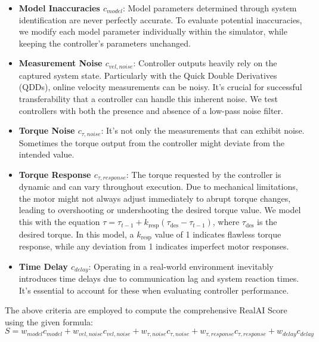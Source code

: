 \begin{itemize}
    \item \textbf{Model Inaccuracies \(c_{model}\)}: Model parameters determined through system identification are never perfectly accurate. To evaluate potential inaccuracies, we modify each model parameter individually within the simulator, while keeping the controller's parameters unchanged.

    \item \textbf{Measurement Noise \(c_{vel, noise}\)}: Controller outputs heavily rely on the captured system state. Particularly with the Quick Double Derivatives (QDDs), online velocity measurements can be noisy. It's crucial for successful transferability that a controller can handle this inherent noise. We test controllers with both the presence and absence of a low-pass noise filter.

    \item \textbf{Torque Noise \(c_{\tau,noise}\)}: It's not only the measurements that can exhibit noise. Sometimes the torque output from the controller might deviate from the intended value.

    \item \textbf{Torque Response \(c_{\tau,response}\)}: The torque requested by the controller is dynamic and can vary throughout execution. Due to mechanical limitations, the motor might not always adjust immediately to abrupt torque changes, leading to overshooting or undershooting the desired torque value. We model this with the equation \(\tau = \tau_{t-1} + k_{\text{resp}} (\tau_{\text{des}} - \tau_{t-1})\), where \(\tau_{\text{des}}\) is the desired torque. In this model, a \(k_{\text{resp}}\) value of 1 indicates flawless torque response, while any deviation from 1 indicates imperfect motor responses.

    \item \textbf{Time Delay \(c_{delay}\)}: Operating in a real-world environment inevitably introduces time delays due to communication lag and system reaction times. It's essential to account for these when evaluating controller performance.
\end{itemize}

The above criteria are employed to compute the comprehensive RealAI Score using the given formula:
\begin{equation}
 S = w_{model} c_{model} + 
    w_{vel, noise} c_{vel, noise} +  
    w_{\tau, noise} c_{\tau, noise} +  
    w_{\tau, response} c_{\tau, response} +  
    w_{delay} c_{delay}
\end{equation}

